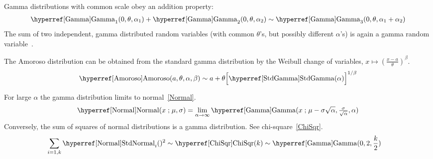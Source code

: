 

\label{GammaInterrelations}



Gamma distributions with common scale obey an addition property:
\begin{align*}
\opr{Gamma}_1(0, \theta, \alpha_1) +  \opr{Gamma}_2(0, \theta,\alpha_2) \sim \opr{Gamma}_3(0, \theta,\alpha_1+\alpha_2)
\checked
\end{align*}
The  sum of two independent, gamma distributed random variables (with common $\theta$'s, but possibly different $\alpha$'s) is again a gamma random variable~\cite{Johnson1994}.

The Amoroso distribution can be obtained from the standard gamma distribution by the Weibull change of variables, $x \mapsto \left(\tfrac{x-a}{\theta}\right)^\beta$.
\[
\opr{Amoroso}(a ,\theta,\alpha,\beta) \sim
a+\theta \Big[{\opr{StdGamma}}(\alpha)\Big]^{1/\beta} 
\checked
\notag
\]


For large $\alpha$ the gamma distribution limits to normal~\eqref{Normal}.
\[
\opr{Normal}(x\given \mu,\sigma)   = 
\lim_{\alpha\rightarrow\infty} \opr{Gamma} (x\given  \mu- \sigma\sqrt{\alpha}, \tfrac{\sigma}{\sqrt{\alpha}}, \alpha)
\checked %
\notag
\]
Conversely, the sum of squares of normal distributions is a gamma distribution. See chi-square~\eqref{ChiSqr}.
\begin{align*}
\sum_{i=1,k}\oprr{StdNormal}{Normal}_i()^{2} & \sim \opr{ChiSqr}(k)  
 \sim \opr{Gamma}(0, 2,\frac{k}{2})  
 \checked
 \notag
\end{align*}



